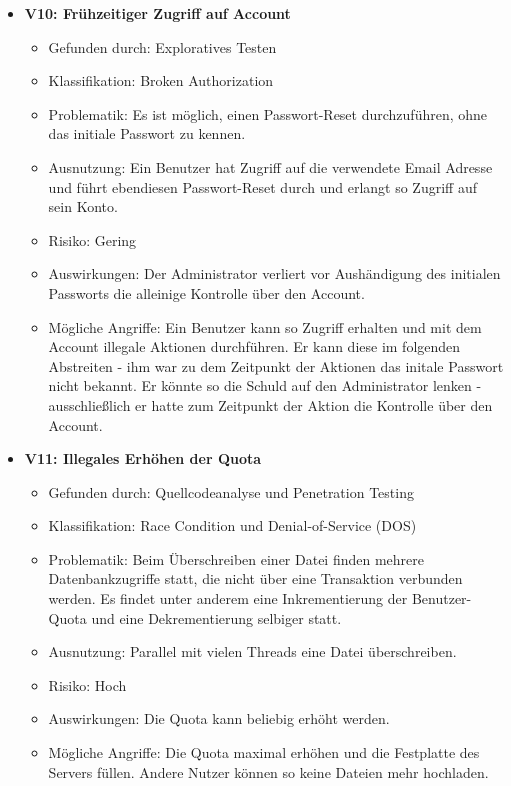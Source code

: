 \documentclass[12pt,DIV14,BCOR10mm,a4paper,parskip=half-,headsepline,headinclude,english,ngerman,bibliography=totocnumbered]{scrreprt}
\begin{document}
\begin{itemize}
  \hypertarget{vulnerability10}{}
  \item \textbf{V10: Frühzeitiger Zugriff auf Account}
  \begin{itemize}
  \item Gefunden durch: Exploratives Testen
  \item Klassifikation: Broken Authorization
  \item Problematik: Es ist möglich, einen Passwort-Reset durchzuführen, ohne das initiale Passwort zu kennen.
  \item Ausnutzung: Ein Benutzer hat Zugriff auf die verwendete Email Adresse und führt ebendiesen Passwort-Reset durch und erlangt so Zugriff auf sein Konto.
  \item Risiko: Gering
  \item Auswirkungen: Der Administrator verliert vor Aushändigung des initialen Passworts die alleinige Kontrolle über den Account.
  \item Mögliche Angriffe: Ein Benutzer kann so Zugriff erhalten und mit dem Account illegale Aktionen durchführen. Er kann diese im folgenden Abstreiten - ihm war zu dem Zeitpunkt der Aktionen das initale Passwort nicht bekannt. Er könnte so die Schuld auf den Administrator lenken - ausschließlich er hatte zum Zeitpunkt der Aktion die Kontrolle über den Account.
  \end{itemize}

  \hypertarget{vulnerability11}{}
  \item \textbf{V11: Illegales Erhöhen der Quota}
  \begin{itemize}
  \item Gefunden durch: Quellcodeanalyse und Penetration Testing
  \item Klassifikation: Race Condition und Denial-of-Service (DOS)
  \item Problematik: Beim Überschreiben einer Datei finden mehrere Datenbankzugriffe statt, die nicht über eine Transaktion verbunden werden. Es findet unter anderem eine Inkrementierung der Benutzer-Quota und eine Dekrementierung selbiger statt.
  \item Ausnutzung: Parallel mit vielen Threads eine Datei überschreiben.
  \item Risiko: Hoch
  \item Auswirkungen: Die Quota kann beliebig erhöht werden.
  \item Mögliche Angriffe: Die Quota maximal erhöhen und die Festplatte des Servers füllen. Andere Nutzer können so keine Dateien mehr hochladen.
  \end{itemize}


\end{itemize}
\end{document}

